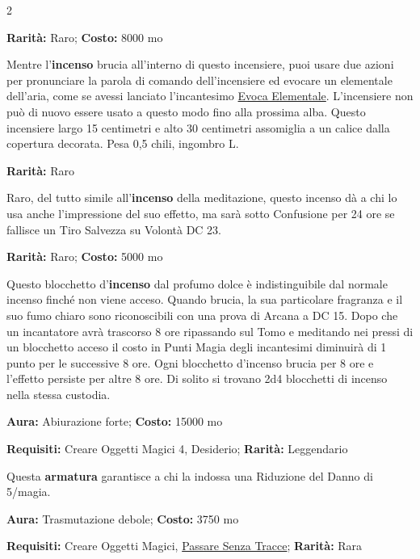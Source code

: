 \begin{multicols}{2}

\textbf{Rarità:} Raro; \textbf{Costo:} 8000 mo

Mentre l'\textbf{incenso} brucia all'interno di questo incensiere, puoi usare due azioni per pronunciare la parola di comando dell'incensiere ed evocare un elementale dell'aria, come se avessi lanciato l'incantesimo \hyperlink{Evoca Elementale}{Evoca Elementale}. L'incensiere non può di nuovo essere usato a questo modo fino alla prossima alba. Questo incensiere largo 15 centimetri e alto 30 centimetri assomiglia a un calice dalla copertura decorata. Pesa 0,5 chili, ingombro L.


\textbf{Rarità:} Raro

Raro, del tutto simile all'\textbf{incenso} della meditazione, questo incenso dà a chi lo usa anche l'impressione del suo effetto, ma sarà sotto Confusione per 24 ore se fallisce un Tiro Salvezza su Volontà DC 23.


\textbf{Rarità:} Raro; \textbf{Costo:} 5000 mo

Questo blocchetto d'\textbf{incenso} dal profumo dolce è indistinguibile dal normale incenso finché non viene acceso. Quando brucia, la sua particolare fragranza e il suo fumo chiaro sono riconoscibili con una prova di Arcana a DC 15. Dopo che un incantatore avrà trascorso 8 ore ripassando sul Tomo e meditando nei pressi di un blocchetto acceso il costo in Punti Magia degli incantesimi diminuirà di 1 punto per le successive 8 ore. Ogni blocchetto d'incenso brucia per 8 ore e l'effetto persiste per altre 8 ore. Di solito si trovano 2d4 blocchetti di incenso nella stessa custodia.


\textbf{Aura:} Abiurazione forte; \textbf{Costo:} 15000 mo

\textbf{Requisiti:} Creare Oggetti Magici 4, Desiderio; \textbf{Rarità:} Leggendario

Questa \textbf{armatura} garantisce a chi la indossa una Riduzione del Danno di 5/magia.


\textbf{Aura:} Trasmutazione debole; \textbf{Costo:} 3750 mo

\textbf{Requisiti:} Creare Oggetti Magici, \hyperlink{Passare Senza Tracce}{Passare Senza Tracce}; \textbf{Rarità:} Rara


\end{multicols}
